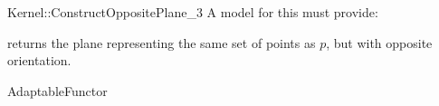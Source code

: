 \begin{ccRefFunctionObjectConcept}{Kernel::ConstructOppositePlane_3}
A model for this must provide:


{returns the plane representing the same set of points as $p$,
but with opposite orientation.}

\ccRefines
AdaptableFunctor

\ccSeeAlso
{} \\

\end{ccRefFunctionObjectConcept}
